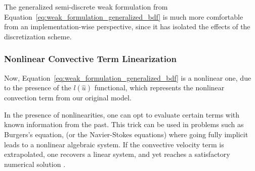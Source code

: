 \documentclass[../../thesis.tex]{subfiles}
\begin{document}
The generalized semi-discrete weak formulation from 
Equation~\eqref{eq:weak_formulation_generalized_bdf} 
is much more comfortable from an implementation-wise perspective,
since it has isolated the effects of the discretization scheme.

\subsubsection{Nonlinear Convective Term Linearization}
Now, Equation~\eqref{eq:weak_formulation_generalized_bdf}
is a nonlinear one, due to the presence of the $l(\hat{u})$ functional,
which represents the nonlinear convection term from our original model.

In the presence of nonlinearities, one can opt to evaluate certain terms 
with known information from the past.
This trick can be used in problems such as Burgers's equation, 
(or the Navier-Stokes equations)
where going fully implicit leads to a nonlinear algebraic system. 
If the convective velocity term is extrapolated, 
one recovers a linear system, and yet reaches a satisfactory numerical solution 
\cite{Santo_Manzoni_2019}.


\end{document}
